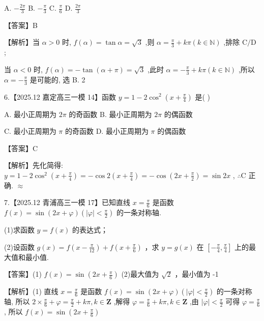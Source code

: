 \documentclass[10pt]{article}
\begin{document}
A. \(- \frac{2\pi }{3}\) B. \(- \frac{\pi }{3}\) C. \(\frac{\pi }{6}\) D. \(\frac{2\pi }{3}\)

【答案】B

【解析】当 \(\alpha  > 0\) 时, \(f\left( \alpha \right)  = \tan \alpha  = \sqrt{3}\) ,则 \(\alpha  = \frac{\pi }{3} + {k\pi }\left( {k \in  \mathbb{N}}\right)\) ,排除 \(\mathrm{C}/\mathrm{D}\) ;

当 \(\alpha  < 0\) 时, \(f\left( \alpha \right)  =  - \tan \left( {\alpha  + \pi }\right)  = \sqrt{3}\) ,此时 \(\alpha  =  - \frac{\pi }{3} + {k\pi }\left( {k \in  \mathbb{N}}\right)\) ,所以 \(\alpha  =  - \frac{\pi }{3}\) 是可能的, 选 B. 2

6.【2025.12 嘉定高三一模 14】函数 \(y = 1 - 2{\cos }^{2}\left( {x + \frac{\pi }{4}}\right)\) 是( )

A. 最小正周期为 \({2\pi }\) 的奇函数 B. 最小正周期为 \({2\pi }\) 的偶函数

C. 最小正周期为 \(\pi\) 的奇函数 D. 最小正周期为 \(\pi\) 的偶函数

【答案】C

【解析】先化简得: \(y = 1 - 2{\cos }^{2}\left( {x + \frac{\pi }{4}}\right)  =  - \cos 2\left( {x + \frac{\pi }{4}}\right)  =  - \cos \left( {{2x} + \frac{\pi }{2}}\right)  = \sin {2x}\) , \(\therefore \mathrm{C}\) 正确. \(\approx\)

7.【2025.12 青浦高三一模 17】已知直线 \(x = \frac{\pi }{6}\) 是函数 \(f\left( x\right)  = \sin \left( {{2x} + \varphi }\right) \left( {\left| \varphi \right|  < \frac{\pi }{2}}\right)\) 的一条对称轴.

(1)求函数 \(y = f\left( x\right)\) 的表达式；

(2)设函数 \(g\left( x\right)  = f\left( {x - \frac{\pi }{12}}\right)  + f\left( {x + \frac{\pi }{6}}\right)\) ，求 \(y = g\left( x\right)\) 在 \(\left\lbrack  {-\frac{\pi }{4},\frac{\pi }{4}}\right\rbrack\) 上的最大值和最小值.

【答案】(1) \(f\left( x\right)  = \sin \left( {{2x} + \frac{\pi }{6}}\right)\) (2)最大值为 \(\sqrt{2}\) ，最小值为 -1

【解析】(1) 直线 \(x = \frac{\pi }{6}\) 是函数 \(f\left( x\right)  = \sin \left( {{2x} + \varphi }\right) \left( {\left| \varphi \right|  < \frac{\pi }{2}}\right)\) 的一条对称轴, 所以 \(2 \times  \frac{\pi }{6} + \varphi  = \frac{\pi }{2} + {k\pi },k \in  \mathbf{Z}\) ,解得 \(\varphi  = \frac{\pi }{6} + {k\pi },k \in  \mathbf{Z}\) ,由 \(\left| \varphi \right|  < \frac{\pi }{2}\) 可得 \(\varphi  = \frac{\pi }{6}\) , 所以 \(f\left( x\right)  = \sin \left( {{2x} + \frac{\pi }{6}}\right)\)
\end{document}
